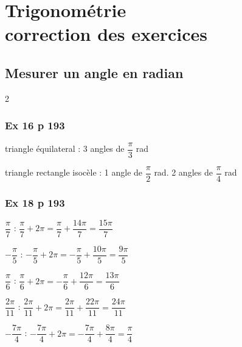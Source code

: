 \documentclass[a4paper,french]{book}
\begin{document}
\graphicspath{{../images/}}
\setcounter{chapter}{1}
\chapter[Correction des exercices]{Trigonométrie \\ correction des exercices}
\thispagestyle{fancy}

\section*{Mesurer un angle en radian}

\begin{multicols}{2}
\subsection*{Ex 16 p 193}

\begin{enumMet}
    \item triangle équilateral : 3 angles de $\dfrac{\pi}{3}$ rad
    \item triangle rectangle isocèle : 1 angle de $\dfrac{\pi}{2}$ rad. 2 angles de $\dfrac{\pi}{4}$ rad
\end{enumMet}

\columnbreak
\subsection*{Ex 18 p 193}

\begin{itemMet}
    \item $\dfrac{\pi}{7}$ : $\dfrac{\pi}{7}+2\pi=\dfrac{\pi}{7}+\dfrac{14\pi}{7}=\dfrac{15\pi}{7}$
    \item $-\dfrac{\pi}{5}$ : $-\dfrac{\pi}{5}+2\pi=-\dfrac{\pi}{5}+\dfrac{10\pi}{5}=\dfrac{9\pi}{5}$
    \item $\dfrac{\pi}{6}$ : $\dfrac{\pi}{6}+2\pi=-\dfrac{\pi}{6}+\dfrac{12\pi}{6}=\dfrac{13\pi}{6}$
    \item $\dfrac{2\pi}{11}$ : $\dfrac{2\pi}{11}+2\pi=\dfrac{2\pi}{11}+\dfrac{22\pi}{11}=\dfrac{24\pi}{11}$
    \item $-\dfrac{7\pi}{4}$ : $-\dfrac{7\pi}{4}+2\pi=-\dfrac{7\pi}{4}+\dfrac{8\pi}{4}=\dfrac{\pi}{4}$
\end{itemMet}

\end{multicols}
\end{document}
